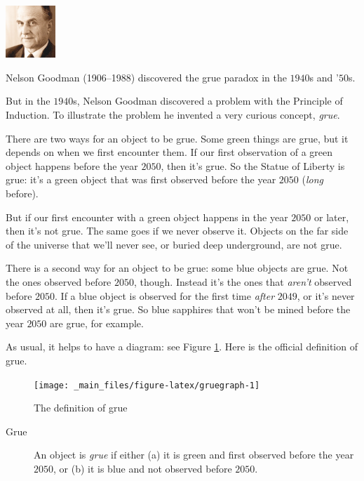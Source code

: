 \documentclass[justified]{tufte-book}
\theoremstyle{definition}
\theoremstyle{definition}
\theoremstyle{definition}
\theoremstyle{definition}
\theoremstyle{remark}
\begin{document}
\begin{marginfigure}
\includegraphics[width=0.74in]{img/goodman} \caption[Nelson Goodman (1906--1988) discovered the grue paradox in the $1940$s and '$50$s]{Nelson Goodman (1906--1988) discovered the grue paradox in the $1940$s and '$50$s.}\label{fig:unnamed-chunk-169}
\end{marginfigure}

But in the \(1940\)s, Nelson Goodman discovered a problem with the Principle of Induction. To illustrate the problem he invented a very curious concept, \emph{grue}.

There are two ways for an object to be grue. Some green things are grue, but it depends on when we first encounter them. If our first observation of a green object happens before the year \(2050\), then it's grue. So the Statue of Liberty is grue: it's a green object that was first observed before the year \(2050\) (\emph{long} before).

But if our first encounter with a green object happens in the year \(2050\) or later, then it's not grue. The same goes if we never observe it. Objects on the far side of the universe that we'll never see, or buried deep underground, are not grue.

There is a second way for an object to be grue: some blue objects are grue. Not the ones observed before \(2050\), though. Instead it's the ones that \emph{aren't} observed before \(2050\). If a blue object is observed for the first time \emph{after} \(2049\), or it's never observed at all, then it's grue. So blue sapphires that won't be mined before the year \(2050\) are grue, for example.

As usual, it helps to have a diagram: see Figure \ref{fig:gruegraph}. Here is the official definition of grue.

\begin{figure}
\texttt{[image: \_main\_files/figure-latex/gruegraph-1]} \caption[The definition of grue]{The definition of grue}\label{fig:gruegraph}
\end{figure}

\begin{description}
\item[Grue]
An object is \emph{grue} if either (a) it is green and first observed before the year \(2050\), or (b) it is blue and not observed before \(2050\).
\end{description}
\end{document}

